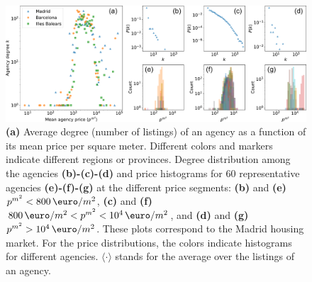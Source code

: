 \begin{figure}
    \centering
    \includegraphics[width =\textwidth]{Figs/Idealista_dynamics/panel_price.pdf}
	\caption[Price segmentation by the degree.]{\textbf{(a)} Average degree (number of listings) of an agency as a function of its mean price per square meter. Different colors and markers indicate different regions or provinces. Degree distribution among the agencies \textbf{(b)-(c)-(d)} and price histograms for 60 representative agencies \textbf{(e)-(f)-(g)} at the different price segments: \textbf{(b)} and \textbf{(e)} $p^{{m}^2} < 800 \, \textup{\euro} / m^2$, \textbf{(c)} and \textbf{(f)} $800 \, \textup{\euro}  / m^2 < p^{{m}^2} < 10^4 \, \textup{\euro}  / m^2$, and \textbf{(d)} and \textbf{(g)} $p^{{m}^2} > 10^4 \, \textup{\euro}  / m^2$. These plots correspond to the Madrid housing market. For the price distributions, the colors indicate histograms for different agencies. $\langle \cdot \rangle$ stands for the average over the listings of an agency. \label{fig:panel_price}}
\end{figure}

